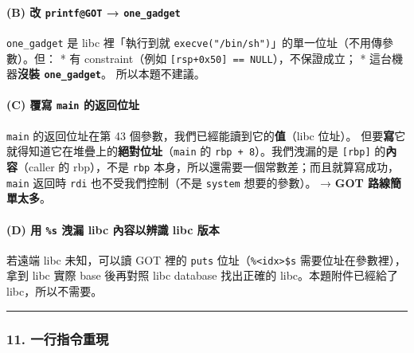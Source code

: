 \documentclass[10pt,a4paper]{article}
\begin{document}
\paragraph{\texorpdfstring{(B) 改 \texttt{printf@GOT} →
\texttt{one\_\allowbreak{}gadget}}{(B) 改 printf@GOT → one\_gadget}}\label{b-ux6539-printfgot-one_gadget}

\texttt{one\_\allowbreak{}gadget} 是 libc 裡「執行到就
\texttt{execve("/\allowbreak{}bin/\allowbreak{}sh")}」的單一位址（不用傳參數）。但： * 有
constraint（例如 \texttt{{[}rsp+0x50{]}\ \allowbreak{}==\ \allowbreak{}NULL}），不保證成立； *
這台機器\textbf{沒裝 \texttt{one\_\allowbreak{}gadget}}。 所以本題不建議。

\paragraph{\texorpdfstring{(C) 覆寫 \texttt{main}
的返回位址}{(C) 覆寫 main 的返回位址}}\label{c-ux8986ux5beb-main-ux7684ux8fd4ux56deux4f4dux5740}

\texttt{main} 的返回位址在第 43
個參數，我們已經能讀到它的\textbf{值}（libc 位址）。
但要\textbf{寫}它就得知道它在堆疊上的\textbf{絕對位址}（\texttt{main} 的
\texttt{rbp\ \allowbreak{}+\ \allowbreak{}8}）。我們洩漏的是 \texttt{{[}rbp{]}}
的\textbf{內容}（caller 的 rbp），不是 \texttt{rbp}
本身，所以還需要一個常數差；而且就算寫成功，\texttt{main} 返回時
\texttt{rdi} 也不受我們控制（不是 \texttt{system} 想要的參數）。 →
\textbf{GOT 路線簡單太多}。

\paragraph{\texorpdfstring{(D) 用 \texttt{\%\allowbreak{}s} 洩漏 libc 內容以辨識 libc
版本}{(D) 用 \%s 洩漏 libc 內容以辨識 libc 版本}}\label{d-ux7528-s-ux6d29ux6f0f-libc-ux5167ux5bb9ux4ee5ux8fa8ux8b58-libc-ux7248ux672c}

若遠端 libc 未知，可以讀 GOT 裡的 \texttt{puts}
位址（\texttt{\%\allowbreak{}\textless{}\allowbreak{}idx\textgreater{}\allowbreak{}\$\allowbreak{}s}
需要位址在參數裡），拿到 libc 實際 base 後再對照 libc database
找出正確的 libc。本題附件已經給了 libc，所以不需要。

\begin{center}\rule{0.5\linewidth}{0.5pt}\end{center}

\subsubsection{11.
一行指令重現}\label{ux4e00ux884cux6307ux4ee4ux91cdux73fe}
\end{document}
